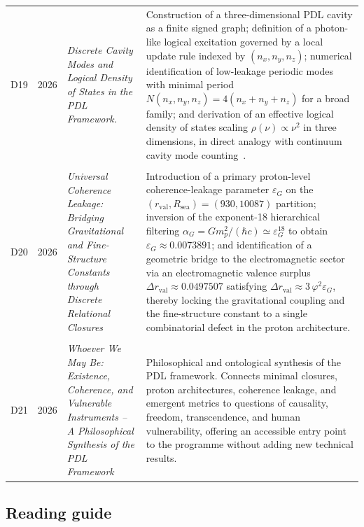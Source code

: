 \documentclass[11pt,a4paper]{article}
\begin{document}
\begin{longtable}{@{}llL{4cm}p{9.5cm}@{}}
D19 &
2026 &
\emph{Discrete Cavity Modes and Logical Density of States in the PDL Framework.}
 & Construction of a three-dimensional PDL cavity as a finite signed graph; definition of a photon-like logical excitation governed by a local update rule indexed by $(n_x,n_y,n_z)$; numerical identification of low-leakage periodic modes with minimal period $N(n_x,n_y,n_z)=4(n_x+n_y+n_z)$ for a broad family; and derivation of an effective logical density of states scaling $\rho(\nu)\propto \nu^2$ in three dimensions, in direct analogy with continuum cavity mode counting~\citep{PDLCavityModes2026}.\\\\[0.4em]

D20 & 2026 &
\textit{Universal Coherence Leakage: Bridging Gravitational and Fine-Structure Constants through Discrete Relational Closures} &
Introduction of a primary proton-level coherence-leakage parameter $\varepsilon_G$ on the
$(r_{\mathrm{val}},R_{\mathrm{sea}})=(930,10087)$ partition; inversion of the exponent-18 hierarchical filtering
$\alpha_G = G m_p^2 / (\hbar c) \simeq \varepsilon_G^{18}$ to obtain $\varepsilon_G \approx 0.0073891$; and
identification of a geometric bridge to the electromagnetic sector via an electromagnetic valence surplus
$\Delta r_{\mathrm{val}} \approx 0.0497507$ satisfying $\Delta r_{\mathrm{val}} \approx 3\,\varphi^2 \varepsilon_G$, thereby
locking the gravitational coupling and the fine-structure constant to a single combinatorial defect in the
proton architecture.\citep{Universal_Coherence_Leakage_2026} \\\\[0.5em]

D21 & 2026 & \textit{Whoever We May Be: Existence, Coherence, and Vulnerable Instruments -- A Philosophical Synthesis of the PDL Framework} &
Philosophical and ontological synthesis of the PDL framework. Connects minimal closures, proton architectures, coherence leakage, and emergent metrics to questions of causality, freedom, transcendence, and human vulnerability, offering an accessible entry point to the programme without adding new technical results.\citep{WhoeverWeMayBe2026} \\[0.5em]

\bottomrule
\end{longtable}

\subsection*{Reading guide}
\end{document}
